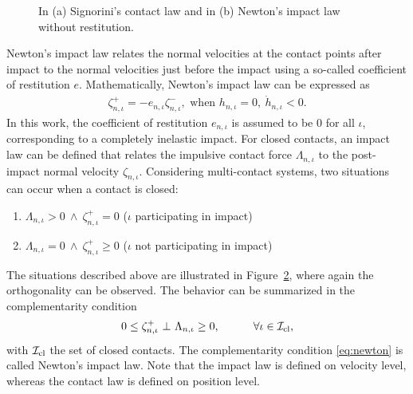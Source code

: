 \documentclass[../DC2017114Bouma.tex]{subfiles}
\begin{document}
\begin{figure}[h]
\begin{subfigure}{0.3\textwidth}
\caption{}\label{fig:newtonimpact}
\end{subfigure}
\caption{In \textnormal{(a)} Signorini's contact law and in \textnormal{(b)} Newton's impact law without restitution.}
\end{figure}
Newton's impact law relates the normal velocities at the contact points after impact to the normal velocities just before the impact using a so-called coefficient of restitution $e$. Mathematically, Newton's impact law can be expressed as
\begin{align}
\zeta^+_{n,\iota} = -e_{n,\iota}\zeta^-_{n,\iota},\text{ when }h_{n,\iota}=0,\ \dot{h}_{n,\iota}<0.
\end{align}
%
%
In this work, the coefficient of restitution $e_{n,\iota}$ is assumed to be $0$ for all $\iota$, corresponding to a completely inelastic impact. For closed contacts, an impact law can be defined that relates the impulsive contact force $\Lambda_{n,\iota}$ to the post-impact normal velocity $\zeta_{n,\iota}$. Considering multi-contact systems, two situations can occur when a contact is closed:
\begin{enumerate}
\item $\Lambda_{n,\iota} > 0\ \wedge\ \zeta^+_{n,\iota} = 0$ ($\iota$ participating in impact)
\item $\Lambda_{n,\iota} = 0\ \wedge\ \zeta^+_{n,\iota} \geq 0$ ($\iota$ not participating in impact)
\end{enumerate}
The situations described above are illustrated in Figure~\ref{fig:newtonimpact}, where again the orthogonality can be observed. The behavior can be summarized in the complementarity condition
\begin{align}
0\leq \zeta^+_{n,\iota}\ \bot\ \Lambda_{n,\iota} \geq 0,\quad  \qquad \forall \iota\in\mathcal{I}_{\text{cl}},\label{eq:newton}
\end{align}
with $\mathcal{I}_{\text{cl}}$ the set of closed contacts. The complementarity condition \eqref{eq:newton} is called Newton's impact law. Note that the impact law is defined on velocity level, whereas the contact law is defined on position level.
\end{document}
